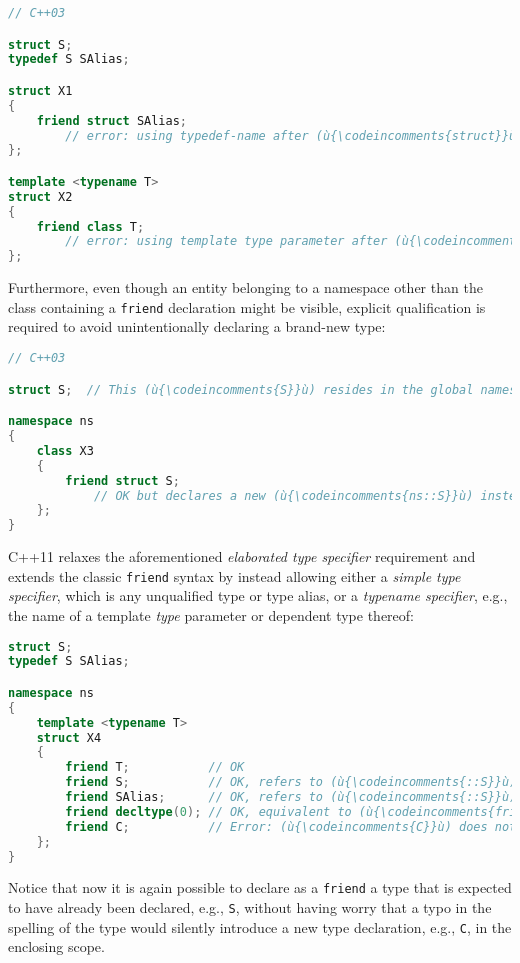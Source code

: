 \begin{lstlisting}[language=C++]
// C++03

struct S;
typedef S SAlias;

struct X1
{
    friend struct SAlias;
        // error: using typedef-name after (ù{\codeincomments{struct}}ù)
};

template <typename T>
struct X2
{
    friend class T;
        // error: using template type parameter after (ù{\codeincomments{class}}ù)
};
\end{lstlisting}
    
\noindent Furthermore, even though an entity belonging to a namespace other than
the class containing a \texttt{friend} declaration might be visible,
explicit qualification is required to avoid unintentionally declaring a
brand-new type:

\begin{lstlisting}[language=C++]
// C++03

struct S;  // This (ù{\codeincomments{S}}ù) resides in the global namespace.

namespace ns
{
    class X3
    {
        friend struct S;
            // OK but declares a new (ù{\codeincomments{ns::S}}ù) instead of referring to (ù{\codeincomments{::S}}ù)
    };
}
\end{lstlisting}
    
\noindent C++11 relaxes the aforementioned \emph{elaborated type specifier}
requirement and extends the classic \texttt{friend} syntax by instead
allowing either a \emph{simple type specifier}, which is any unqualified
type or type alias, or a \emph{typename specifier}, e.g., the name of a
template \emph{type} parameter or dependent type thereof:

\begin{lstlisting}[language=C++]
struct S;
typedef S SAlias;

namespace ns
{
    template <typename T>
    struct X4
    {
        friend T;           // OK
        friend S;           // OK, refers to (ù{\codeincomments{::S}}ù)
        friend SAlias;      // OK, refers to (ù{\codeincomments{::S}}ù)
        friend decltype(0); // OK, equivalent to (ù{\codeincomments{friend int;}}ù)
        friend C;           // Error: (ù{\codeincomments{C}}ù) does not name a type.
    };
}
\end{lstlisting}
    
\noindent Notice that now it is again possible to declare as a \texttt{friend} a
type that is expected to have already been declared, e.g., \texttt{S},
without having worry that a typo in the spelling of the type would
silently introduce a new type declaration, e.g., \texttt{C}, in the
enclosing scope.

